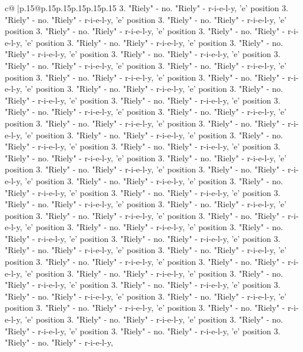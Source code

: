 \documentclass{article}
\begin{document}
{\begin{supertabular}{c@{$\;$}|p{.15\linewidth}@{}p{.15\linewidth}p{.15\linewidth}p{.15\linewidth}p{.15\linewidth}p{.15\linewidth}}
{{{3. "Riely" {-} no. "Riely" {-} r{-}i{-}e{-}l{-}y, 'e' position 3. "Riely" {-} no. "Riely" {-} r{-}i{-}e{-}l{-}y, 'e' position 3. "Riely" {-} no. "Riely" {-} r{-}i{-}e{-}l{-}y, 'e' position 3. "Riely" {-} no. "Riely" {-} r{-}i{-}e{-}l{-}y, 'e' position 3. "Riely" {-} no. "Riely" {-} r{-}i{-}e{-}l{-}y, 'e' position 3. "Riely" {-} no. "Riely" {-} r{-}i{-}e{-}l{-}y, 'e' position 3. "Riely" {-} no. "Riely" {-} r{-}i{-}e{-}l{-}y, 'e' position 3. "Riely" {-} no. "Riely" {-} r{-}i{-}e{-}l{-}y, 'e' position 3. "Riely" {-} no. "Riely" {-} r{-}i{-}e{-}l{-}y, 'e' position 3. "Riely" {-} no. "Riely" {-} r{-}i{-}e{-}l{-}y, 'e' position 3. "Riely" {-} no. "Riely" {-} r{-}i{-}e{-}l{-}y, 'e' position 3. "Riely" {-} no. "Riely" {-} r{-}i{-}e{-}l{-}y, 'e' position 3. "Riely" {-} no. "Riely" {-} r{-}i{-}e{-}l{-}y, 'e' position 3. "Riely" {-} no. "Riely" {-} r{-}i{-}e{-}l{-}y, 'e' position 3. "Riely" {-} no. "Riely" {-} r{-}i{-}e{-}l{-}y, 'e' position 3. "Riely" {-} no. "Riely" {-} r{-}i{-}e{-}l{-}y, 'e' position 3. "Riely" {-} no. "Riely" {-} r{-}i{-}e{-}l{-}y, 'e' position 3. "Riely" {-} no. "Riely" {-} r{-}i{-}e{-}l{-}y, 'e' position 3. "Riely" {-} no. "Riely" {-} r{-}i{-}e{-}l{-}y, 'e' position 3. "Riely" {-} no. "Riely" {-} r{-}i{-}e{-}l{-}y, 'e' position 3. "Riely" {-} no. "Riely" {-} r{-}i{-}e{-}l{-}y, 'e' position 3. "Riely" {-} no. "Riely" {-} r{-}i{-}e{-}l{-}y, 'e' position 3. "Riely" {-} no. "Riely" {-} r{-}i{-}e{-}l{-}y, 'e' position 3. "Riely" {-} no. "Riely" {-} r{-}i{-}e{-}l{-}y, 'e' position 3. "Riely" {-} no. "Riely" {-} r{-}i{-}e{-}l{-}y, 'e' position 3. "Riely" {-} no. "Riely" {-} r{-}i{-}e{-}l{-}y, 'e' position 3. "Riely" {-} no. "Riely" {-} r{-}i{-}e{-}l{-}y, 'e' position 3. "Riely" {-} no. "Riely" {-} r{-}i{-}e{-}l{-}y, 'e' position 3. "Riely" {-} no. "Riely" {-} r{-}i{-}e{-}l{-}y, 'e' position 3. "Riely" {-} no. "Riely" {-} r{-}i{-}e{-}l{-}y, 'e' position 3. "Riely" {-} no. "Riely" {-} r{-}i{-}e{-}l{-}y, 'e' position 3. "Riely" {-} no. "Riely" {-} r{-}i{-}e{-}l{-}y, 'e' position 3. "Riely" {-} no. "Riely" {-} r{-}i{-}e{-}l{-}y, 'e' position 3. "Riely" {-} no. "Riely" {-} r{-}i{-}e{-}l{-}y, 'e' position 3. "Riely" {-} no. "Riely" {-} r{-}i{-}e{-}l{-}y, 'e' position 3. "Riely" {-} no. "Riely" {-} r{-}i{-}e{-}l{-}y, 'e' position 3. "Riely" {-} no. "Riely" {-} r{-}i{-}e{-}l{-}y, 'e' position 3. "Riely" {-} no. "Riely" {-} r{-}i{-}e{-}l{-}y, 'e' position 3. "Riely" {-} no. "Riely" {-} r{-}i{-}e{-}l{-}y, 'e' position 3. "Riely" {-} no. "Riely" {-} r{-}i{-}e{-}l{-}y, 'e' position 3. "Riely" {-} no. "Riely" {-} r{-}i{-}e{-}l{-}y, 'e' position 3. "Riely" {-} no. "Riely" {-} r{-}i{-}e{-}l{-}y, 'e' position 3. "Riely" {-} no. "Riely" {-} r{-}i{-}e{-}l{-}y, 'e' position 3. "Riely" {-} no. "Riely" {-} r{-}i{-}e{-}l{-}y, 'e' position 3. "Riely" {-} no. "Riely" {-} r{-}i{-}e{-}l{-}y, 'e' position 3. "Riely" {-} no. "Riely" {-} r{-}i{-}e{-}l{-}y, 'e' position 3. "Riely" {-} no. "Riely" {-} r{-}i{-}e{-}l{-}y, 'e' position 3. "Riely" {-} no. "Riely" {-} r{-}i{-}e{-}l{-}y, 'e' position 3. "Riely" {-} no. "Riely" {-} r{-}i{-}e{-}l{-}y, 'e' position 3. "Riely" {-} no. "Riely" {-} r{-}i{-}e{-}l{-}y, 'e' position 3. "Riely" {-} no. "Riely" {-} r{-}i{-}e{-}l{-}y, }}}
\end{supertabular}}
\end{document}
